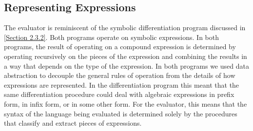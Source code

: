 \subsection{Representing Expressions}
\label{Section 4.1.2}

The evaluator is reminiscent of the symbolic differentiation program discussed in \cref{Section 2.3.2}.
Both programs operate on symbolic expressions.
In both programs, the result of operating on a compound expression is determined by operating recursively on the pieces of the expression and combining the results in a way that depends on the type of the expression.
In both programs we used data abstraction to decouple the general rules of operation from the details of how expressions are represented.
In the differentiation program this meant that the same differentiation procedure could deal with algebraic expressions in prefix form, in infix form, or in some other form.
For the evaluator, this means that the syntax of the language being evaluated is determined solely by the procedures that classify and extract pieces of expressions.

